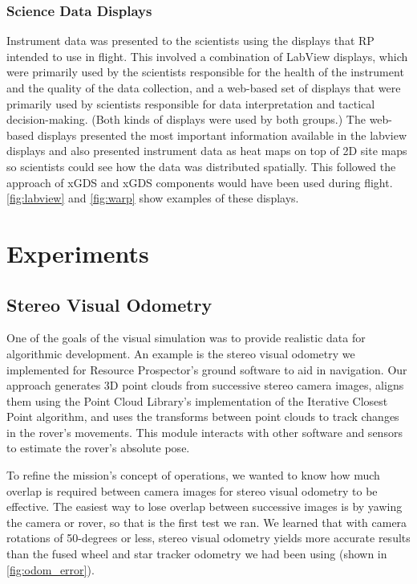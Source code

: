 \documentclass[twocolumn,letterpaper]{IEEEAerospaceCLS}  %
\begin{document}
\subsubsection{Science Data Displays}
Instrument data was presented to the scientists using the displays that RP intended to use in flight.  
This involved a combination of LabView displays, which were primarily used by the scientists responsible for the health of the instrument and the quality of the data collection, and a web-based set of displays \cite{OpenMCT} that were primarily used by scientists responsible for data interpretation and tactical decision-making.  
(Both kinds of displays were used by both groups.)  The web-based displays presented the most important information available in the labview displays and also presented instrument data as heat maps on top of 2D site maps so scientists could see how the data was distributed spatially.  
This followed the approach of xGDS \cite{lee2013reusable} and xGDS components would have been used during flight.  \cref{fig:labview} and  \cref{fig:warp} show examples of these displays.

\section{Experiments}

\subsection{Stereo Visual Odometry}
One of the goals of the visual simulation was to provide realistic data for algorithmic development. An example is the stereo visual odometry we implemented for Resource Prospector's ground software to aid in navigation.
Our approach generates 3D point clouds from successive stereo camera images, aligns them using the Point Cloud Library's implementation of the Iterative Closest Point algorithm, and uses the transforms between point clouds to track changes in the rover's movements. This module interacts with other software and sensors to estimate the rover's absolute pose.

To refine the mission's concept of operations, we wanted to know how much overlap is required between camera images for stereo visual odometry to be effective. 
The easiest way to lose overlap between successive images is by yawing the camera or rover, so that is the first test we ran. 
We learned that with camera rotations of 50-degrees or less, stereo visual odometry yields more accurate results than the fused wheel and star tracker odometry we had been using (shown in \cref{fig:odom_error}).
\end{document}
